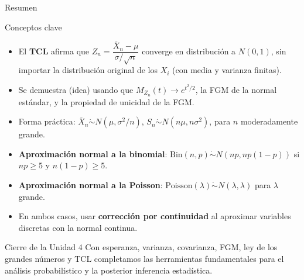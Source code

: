 \documentclass[aspectratio=169,11pt]{beamer}
\begin{document}
\begin{frame}{Resumen}
\begin{block}{Conceptos clave}
\begin{itemize}
\item El \textbf{TCL} afirma que $Z_n = \dfrac{\overline X_n - \mu}{\sigma/\sqrt n}$ converge en distribución a $N(0,1)$, sin importar la distribución original de los $X_i$ (con media y varianza finitas).
\item Se demuestra (idea) usando que $M_{Z_n}(t) \to e^{t^2/2}$, la FGM de la normal estándar, y la propiedad de unicidad de la FGM.
\item Forma práctica: $\overline X_n \dot\sim N(\mu,\sigma^2/n)$, $S_n \dot\sim N(n\mu, n\sigma^2)$, para $n$ moderadamente grande.
\item \textbf{Aproximación normal a la binomial}: $\text{Bin}(n,p) \dot\sim N(np, np(1-p))$ si $np\geq5$ y $n(1-p)\geq5$.
\item \textbf{Aproximación normal a la Poisson}: $\text{Poisson}(\lambda)\dot\sim N(\lambda,\lambda)$ para $\lambda$ grande.
\item En ambos casos, usar \textbf{corrección por continuidad} al aproximar variables discretas con la normal continua.
\end{itemize}
\end{block}

\begin{alertblock}{Cierre de la Unidad 4}
Con esperanza, varianza, covarianza, FGM, ley de los grandes números y TCL completamos las herramientas fundamentales para el análisis probabilístico y la posterior inferencia estadística.
\end{alertblock}
\end{frame}
\end{document}
